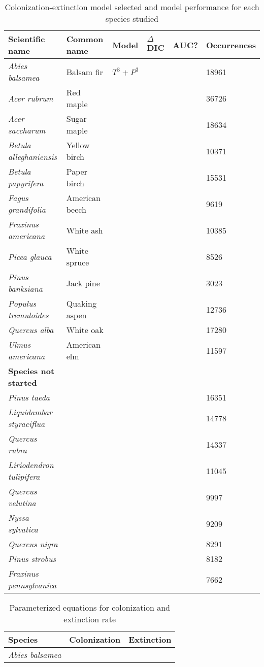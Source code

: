 \begin{table}[h]
\label{tab:species_list}
\caption{Colonization-extinction model selected and model performance for each species studied}
\begin{tabular}{@{}llllll@{}}
\toprule
Scientific name             & Common name    & Model & $\Delta$DIC & AUC? & Occurrences \\ \midrule
{\it Abies balsamea}        & Balsam fir     & $T^3 + P^3$ &  & & 18961 \\
{\it Acer rubrum}           & Red maple      &  &  & & 36726 \\
{\it Acer saccharum}        & Sugar maple    &  &  & & 18634 \\
{\it Betula alleghaniensis} & Yellow birch   &  &  & & 10371 \\
{\it Betula papyrifera}     & Paper birch    &  &  & & 15531 \\
{\it Fagus grandifolia}     & American beech &  &  & & 9619 \\
{\it Fraxinus americana}    & White ash      &  &  & & 10385 \\
{\it Picea glauca}          & White spruce   &  &  & & 8526 \\
{\it Pinus banksiana}       & Jack pine      &  &  & & 3023 \\
{\it Populus tremuloides}   & Quaking aspen  &  &  & & 12736 \\ 
{\it Quercus alba}          & White oak      &  &  & & 17280 \\
{\it Ulmus americana}       & American elm   &  &  & & 11597 \\ \midrule
\textbf{Species not started} & & & & & \\
{\it Pinus taeda} & & & & & 16351 \\
{\it Liquidambar styraciflua} & & & & & 14778 \\
{\it Quercus rubra} & & & & & 14337 \\
{\it Liriodendron tulipifera} & & & & & 11045 \\
{\it Quercus velutina} & & & & & 9997 \\
{\it Nyssa sylvatica} & & & & & 9209 \\
{\it Quercus nigra} & & & & & 8291 \\
{\it Pinus strobus} & & & & & 8182 \\
{\it Fraxinus pennsylvanica} & & & & & 7662 \\
\bottomrule
\end{tabular}
\end{table}

\begin{table}[h]
\label{tab:species_list}
\caption{Parameterized equations for colonization and extinction rate}
\begin{tabular}{lll}
\toprule
Species    & Colonization & Extinction  \\ \midrule
{\it Abies balsamea} & & \\ 
\bottomrule
\end{tabular}
\end{table}